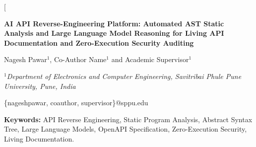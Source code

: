 \documentclass[a4paper,10pt]{article}
\begin{document}
\twocolumn[
  \begin{center}
    {\fontsize{15pt}{17pt}\bfseries AI API Reverse-Engineering Platform: Automated AST Static Analysis and Large Language Model Reasoning for Living API Documentation and Zero-Execution Security Auditing \par}
    \vspace{24pt}
    {\fontsize{11pt}{13pt}\selectfont Nagesh Pawar$^{1}$, Co-Author Name$^{1}$ and Academic Supervisor$^{1}$ \par}
    \vspace{6pt}
    {\fontsize{9pt}{11pt}\itshape $^{1}$Department of Electronics and Computer Engineering, Savitribai Phule Pune University, Pune, India \par}
    \vspace{4pt}
    {\fontsize{9pt}{11pt}\ttfamily \{nageshpawar, coauthor, supervisor\}@sppu.edu \par}
    \vspace{20pt}
  \end{center}

  \noindent\hangindent=2cm\fontsize{9pt}{11pt}\selectfont
  \textbf{Keywords:} API Reverse Engineering, Static Program Analysis, Abstract Syntax Tree, Large Language Models, OpenAPI Specification, Zero-Execution Security, Living Documentation.\par
  \vspace{12pt}
\end{document}

